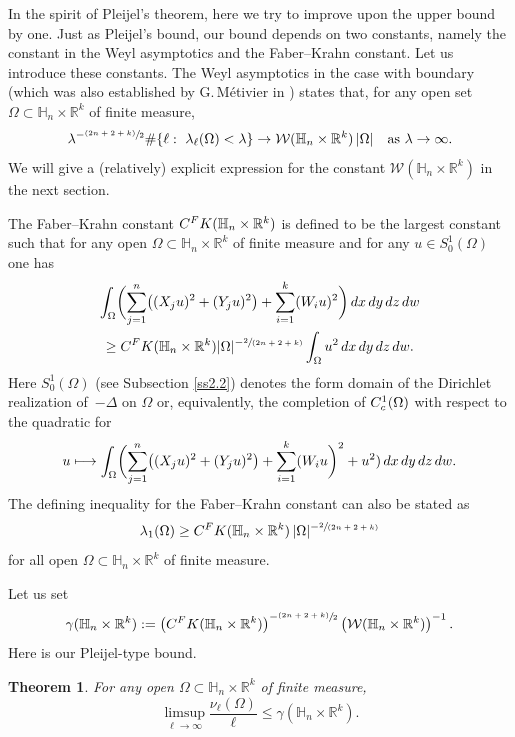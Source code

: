 \documentclass[11pt]{article}
\newcommand\mto{\mathchoice{\longmapsto}{\mapsto}{\mapsto}{\mapsto}}
\let\oldsfrac\sfrac
\renewcommand{\sfrac}[2]{{\oldsfrac{#1}{#2}}}
\newcommand{\psfrac}[2]{{\sfrac{(#1)}{#2}}}
\newcommand{\spfrac}[2]{{\sfrac{#1}{(#2)}}}
\newcommand{\rc}{\textup{c}}
\newcommand{\FK}{\textup{FK}}
\newtheorem{theorem}{Theorem}[section]
\theoremstyle{definition}
\newcommand{\1}{\mathbbm{1}}
\newcommand{\R}{\mathbb{R}}
\numberwithin{equation}{section}
\begin{document}
In the spirit of Pleijel's theorem, here we try to improve upon the upper bound by one. Just as Pleijel's bound, our bound depends on two constants, namely the constant in the Weyl asymptotics and the Faber--Krahn constant. Let us introduce these constants. The Weyl asymptotics in the case with boundary (which was also established by G.\,Métivier in \cite[Th.\,1.3]{Me}) states
that, for any open set $\Omega\subset\mathbb H_n\times\R^k$ of finite measure,
\begin{equation}\label{Metwithbdry}
\lambda^{-\psfrac{2n+2+k}{2}} \#\{ \ell:\ \lambda_\ell(\Omega)<\lambda \} \to \mathcal W(\mathbb H_n\times\R^k) \,|\Omega|
\quad\text{as}\ \lambda\to\infty.
\end{equation}
We will give a (relatively) explicit expression for the constant $\mathcal W(\mathbb H_n\times\R^k)$ in the next section.

The Faber--Krahn constant $C^\FK(\mathbb H_n\times\R^k)$ is defined to be the largest constant such that for any open $\Omega\subset\mathbb H_n\times\R^k$ of finite measure and for any $u\in S^1_0(\Omega)$ one has
\begin{multline}
\label{eq:fk}
\int_\Omega \biggl(\sum_{j=1}^n \bigl((X_ju)^2 + (Y_ju)^2\bigr) + \sum_{i=1}^k (W_iu)^2\biggr)\,dx\,dy\,dz\,dw \\
\geq C^\FK(\mathbb H_n\times\R^k) |\Omega|^{-\spfrac{2}{2n+2+k}} \int_\Omega u^2 \,dx\,dy\,dz\,dw.
\end{multline}
Here $S^1_0(\Omega)$ (see Subsection \ref{ss2.2}) denotes the form domain of the Dirichlet realization of~$-\Delta$ on $\Omega$ or, equivalently, the completion of $C^1_\rc(\Omega)$ with respect to the quadratic for
\[u \mto \int_\Omega \biggl(\sum_{j=1}^n \bigl((X_ju)^2 + (Y_ju)^2 \bigr) + \sum_{i=1}^k (W_iu \biggr)^2 + u^2)\,dx\,dy\,dz\,dw.
\]
The defining inequality for the Faber--Krahn constant can also be stated as
\[
\lambda_1(\Omega) \geq C^\FK(\mathbb H_n\times\R^k) \,|\Omega|^{-\spfrac{2}{2n+2+k}}
\]
for all open $\Omega\subset\mathbb H_n\times\R^k$ of finite measure.

Let us set
\begin{equation}\label{eq:defgamma}
\gamma(\mathbb H_n\times\R^k) := \left(C^\FK(\mathbb H_n\times\R^k)\right)^{-\psfrac{2n+2+k}{2}} \left(\mathcal W(\mathbb H_n\times\R^k)\right)^{-1}.
\end{equation}
Here is our Pleijel-type bound.

\begin{theorem}\label{pleijelnk}
For any open $\Omega\subset\mathbb H_n\times\R^k$ of finite measure,
\[
\limsup_{\ell\to\infty} \frac{\nu_\ell(\Omega)}{\ell} \leq \gamma(\mathbb H_n\times\R^k).
\]
\end{theorem}
\end{document}
